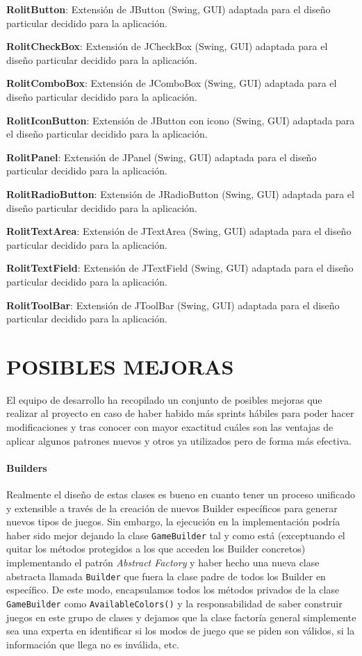 \documentclass[12pt,a4paper,openright]{book}
\theoremstyle{break}
\begin{document}
\textbf{RolitButton}: Extensión de JButton (Swing, GUI) adaptada para el diseño particular decidido para la aplicación.

\textbf{RolitCheckBox}: Extensión de JCheckBox (Swing, GUI) adaptada para el diseño particular decidido para la aplicación.

\textbf{RolitComboBox}: Extensión de JComboBox (Swing, GUI) adaptada para el diseño particular decidido para la aplicación.

\textbf{RolitIconButton}: Extensión de JButton con icono (Swing, GUI) adaptada para el diseño particular decidido para la aplicación.

\textbf{RolitPanel}: Extensión de JPanel (Swing, GUI) adaptada para el diseño particular decidido para la aplicación.

\textbf{RolitRadioButton}: Extensión de JRadioButton (Swing, GUI) adaptada para el diseño particular decidido para la aplicación.

\textbf{RolitTextArea}: Extensión de JTextArea (Swing, GUI) adaptada para el diseño particular decidido para la aplicación.

\textbf{RolitTextField}: Extensión de JTextField (Swing, GUI) adaptada para el diseño particular decidido para la aplicación.

\textbf{RolitToolBar}: Extensión de JToolBar (Swing, GUI) adaptada para el diseño particular decidido para la aplicación.

\chapter{POSIBLES MEJORAS}
El equipo de desarrollo ha recopilado un conjunto de posibles mejoras que realizar al proyecto en caso de haber habido más sprints hábiles para poder hacer modificaciones y tras conocer con mayor exactitud cuáles son las ventajas de aplicar algunos patrones nuevos y otros ya utilizados pero de forma más efectiva.

\subsubsection{Builders}
Realmente el diseño de estas clases es bueno en cuanto tener un proceso unificado y extensible a través de la creación de nuevos Builder específicos para generar nuevos tipos de juegos. Sin embargo, la ejecución en la implementación podría haber sido mejor dejando la clase \texttt{GameBuilder} tal y como está (exceptuando el quitar los métodos protegidos a los que acceden los Builder concretos) implementando el patrón \textit{Abstract Factory} y haber hecho una nueva clase abstracta llamada \texttt{Builder} que fuera la clase padre de todos los Builder en específico. De este modo, encapsulamos todos los métodos privados de la clase \texttt{GameBuilder} como \texttt{AvailableColors()} y la responsabilidad de saber construir juegos en este grupo de clases y dejamos que la clase factoría general simplemente sea una experta en identificar si los modos de juego que se piden son válidos, si la información que llega no es inválida, etc.
\end{document}
